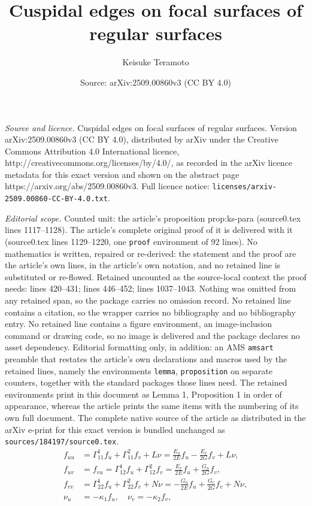 \documentclass[10pt,a4paper]{amsart}
\title{Cuspidal edges on focal surfaces of regular surfaces}
\author{Keisuke Teramoto}
\date{Source: arXiv:2509.00860v3 (CC BY 4.0)}
\begin{document}
\maketitle

\noindent\emph{Source and licence.} Cuspidal edges on focal surfaces of regular surfaces. Version arXiv:2509.00860v3 (CC BY 4.0), distributed by arXiv under the Creative Commons Attribution 4.0 International licence, http://creativecommons.org/licenses/by/4.0/, as recorded in the arXiv licence metadata for this exact version and shown on the abstract page https://arxiv.org/abs/2509.00860v3. Full licence notice: \texttt{licenses/arxiv-2509.00860-CC-BY-4.0.txt}.\par\smallskip

\noindent\textit{Editorial scope.} Counted unit: the article's proposition prop:ks-para (source0.tex lines 1117--1128). The article's complete original proof of it is delivered with it (source0.tex lines 1129--1220, one \texttt{proof} environment of 92 lines). No mathematics is written, repaired or re-derived: the statement and the proof are the article's own lines, in the article's own notation, and no retained line is substituted or re-flowed.  Retained uncounted as the source-local context the proof needs: lines 420--431; lines 446--452; lines 1037--1043.  Nothing was omitted from any retained span, so the package carries no omission record.  No retained line contains a citation, so the wrapper carries no bibliography and no bibliography entry.  No retained line contains a figure environment, an image-inclusion command or drawing code, so no image is delivered and the package declares no asset dependency.  Editorial formatting only, in addition: an AMS \texttt{amsart} preamble that restates the article's own declarations and macros used by the retained lines, namely the environments \texttt{lemma}, \texttt{proposition} on separate counters, together with the standard packages those lines need.  The retained environments print in this document as Lemma 1, Proposition 1 in order of appearance, whereas the article prints the same items with the numbering of its own full document.  The complete native source of the article as distributed in the arXiv e-print for this exact version is bundled unchanged as \texttt{sources/184197/source0.tex}.
\begin{equation}\label{eq:gauss}
	\begin{aligned}
		f_{uu}&=\Gamma^{1}_{11}f_u+\Gamma^{2}_{11}f_v+L\nu
		=\frac{E_u}{2E}f_u - \frac{E_v}{2G}f_v+L\nu,\\
		f_{uv}&=f_{vu}=\Gamma^{1}_{12}f_u+\Gamma^{2}_{12}f_v
		=\frac{E_v}{2E}f_u+\frac{G_u}{2G}f_v,\\
		f_{vv}&=\Gamma^{1}_{22}f_u+\Gamma^{2}_{22}f_v+N\nu
		=-\frac{G_u}{2E}f_u+\frac{G_v}{2G}f_v+N\nu,\\
		\nu_u&=-\kappa_1f_u,\quad 
		\nu_v=-\kappa_2f_v,
	\end{aligned}
\end{equation}
\end{document}
